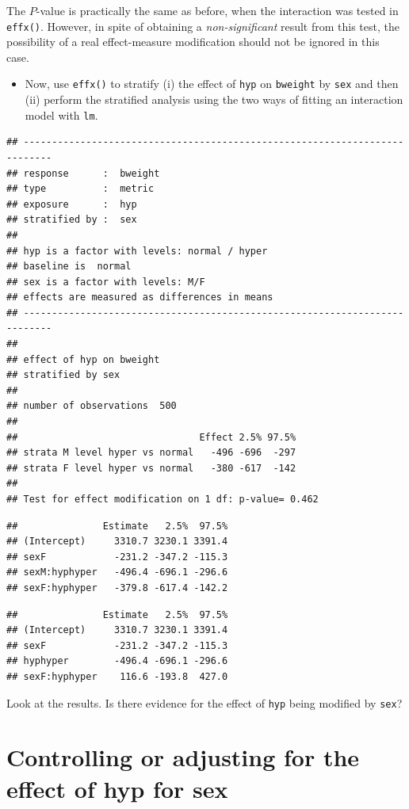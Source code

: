 \documentclass[
]{book}
\providecommand{\tightlist}{%
  \setlength{\itemsep}{0pt}\setlength{\parskip}{0pt}}
\begin{document}
The \(P\)-value is practically the same as before,
when the interaction was tested in \texttt{effx()}.
However, in spite of obtaining a \emph{non-significant}
result from this test, the possibility
of a real effect-measure modification
should not be ignored in this case.

\begin{itemize}
\tightlist
\item
  Now, use \texttt{effx()} to stratify (i) the effect of \texttt{hyp} on \texttt{bweight} by \texttt{sex}
  and then (ii) perform the stratified analysis using the two ways of fitting an interaction model
  with \texttt{lm}.
\end{itemize}

\begin{verbatim}
## --------------------------------------------------------------------------- 
## response      :  bweight 
## type          :  metric 
## exposure      :  hyp 
## stratified by :  sex 
## 
## hyp is a factor with levels: normal / hyper 
## baseline is  normal 
## sex is a factor with levels: M/F 
## effects are measured as differences in means 
## --------------------------------------------------------------------------- 
## 
## effect of hyp on bweight 
## stratified by sex 
## 
## number of observations  500 
## 
##                                Effect 2.5% 97.5%
## strata M level hyper vs normal   -496 -696  -297
## strata F level hyper vs normal   -380 -617  -142
## 
## Test for effect modification on 1 df: p-value= 0.462
\end{verbatim}

\begin{verbatim}
##               Estimate   2.5%  97.5%
## (Intercept)     3310.7 3230.1 3391.4
## sexF            -231.2 -347.2 -115.3
## sexM:hyphyper   -496.4 -696.1 -296.6
## sexF:hyphyper   -379.8 -617.4 -142.2
\end{verbatim}

\begin{verbatim}
##               Estimate   2.5%  97.5%
## (Intercept)     3310.7 3230.1 3391.4
## sexF            -231.2 -347.2 -115.3
## hyphyper        -496.4 -696.1 -296.6
## sexF:hyphyper    116.6 -193.8  427.0
\end{verbatim}

Look at the results. Is there evidence for the effect of \texttt{hyp} being modified by \texttt{sex}?

\section{Controlling or adjusting for the effect of hyp for sex}\label{controlling-or-adjusting-for-the-effect-of-hyp-for-sex}
\end{document}
